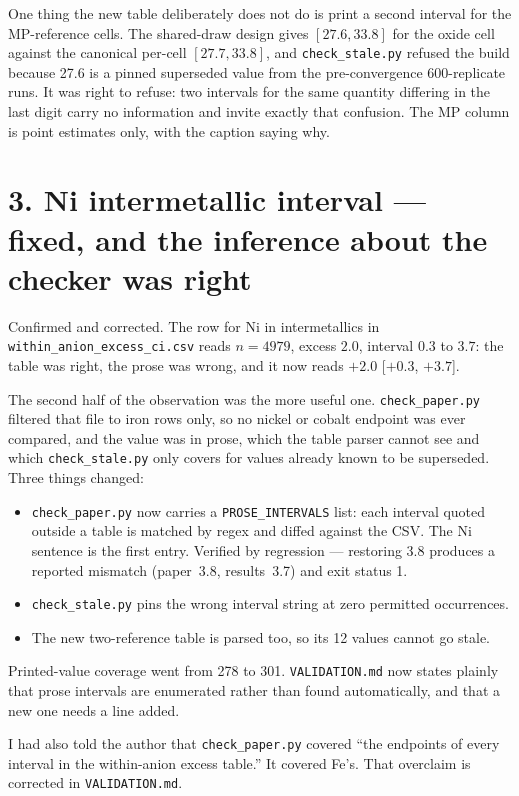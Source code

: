 \documentclass[11pt]{article}
\begin{document}
One thing the new table deliberately does not do is print a second interval for the
MP-reference cells. The shared-draw design gives $[27.6, 33.8]$ for the oxide cell against
the canonical per-cell $[27.7, 33.8]$, and \texttt{check\_stale.py} refused the build
because 27.6 is a pinned superseded value from the pre-convergence 600-replicate runs. It
was right to refuse: two intervals for the same quantity differing in the last digit carry
no information and invite exactly that confusion. The MP column is point estimates only,
with the caption saying why.

\section*{3. Ni intermetallic interval --- fixed, and the inference about the checker was right}

Confirmed and corrected. The row for Ni in intermetallics in
\texttt{within\_anion\_excess\_ci.csv} reads $n=4979$, excess $2.0$, interval $0.3$ to
$3.7$: the table was right, the prose was wrong, and it now reads $+2.0$ [$+0.3$, $+3.7$].

The second half of the observation was the more useful one. \texttt{check\_paper.py}
filtered that file to iron rows only, so no nickel or cobalt
endpoint was ever compared, and the value was in prose, which the table parser cannot see
and which \texttt{check\_stale.py} only covers for values already known to be superseded.
Three things changed:

\begin{itemize}
\item \texttt{check\_paper.py} now carries a \texttt{PROSE\_INTERVALS} list: each interval
quoted outside a table is matched by regex and diffed against the CSV. The Ni sentence is
the first entry. Verified by regression --- restoring 3.8 produces a reported mismatch
(\mbox{paper 3.8}, \mbox{results 3.7}) and exit status 1.
\item \texttt{check\_stale.py} pins the wrong interval string at zero permitted
occurrences.
\item The new two-reference table is parsed too, so its 12 values cannot go stale.
\end{itemize}

Printed-value coverage went from 278 to 301. \texttt{VALIDATION.md} now states plainly
that prose intervals are enumerated rather than found automatically, and that a new one
needs a line added.

I had also told the author that \texttt{check\_paper.py} covered ``the endpoints of every
interval in the within-anion excess table.'' It covered Fe's. That overclaim is corrected
in \texttt{VALIDATION.md}.
\end{document}
